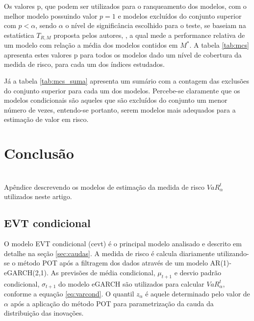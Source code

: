 \documentclass[1p]{elsarticle}
\theoremstyle{definition}
\begin{document}
Os valores p, que podem ser utilizados para o ranqueamento dos modelos, com o melhor modelo possuindo valor $p=1$ e modelos excluídos do conjunto superior com $p<\alpha$, sendo $\alpha$ o nível de significância escolhido para o teste, se baseiam na estatística $T_{R, M}$ proposta pelos autores, \cite{Hansen2011}, a qual mede a performance relativa de um modelo com relação a média dos modelos contidos em $M^\ast$. A tabela \ref{tab:mcs} apresenta estes valores p para todos os modelos dado um nível de cobertura da medida de risco, para cada um dos índices estudados.





Já a tabela \ref{tab:mcs_suma} apresenta um sumário com a contagem das exclusões do conjunto superior para cada um dos modelos. Percebe-se claramente que os modelos condicionais são aqueles que são excluídos do conjunto um menor número de vezes, entendo-se portanto, serem modelos mais adequados para a estimação de valor em risco.

\section{Conclusão}



\appendix
\section{}
\label{apendice}

Apêndice descrevendo os modelos de estimação da medida de risco $VaR^t_\alpha$ utilizados neste artigo.

\subsection{EVT condicional}

O modelo EVT condicional (cevt) é o principal modelo analisado e descrito em detalhe na seção \ref{sec:caudas}. A medida de risco é calcula diariamente utilizando-se o método POT após a filtragem dos dados através de um modelo AR(1)-eGARCH(2,1). As previsões de média condicional, $\mu_{t+1}$ e desvio padrão condicional, $\sigma_{t+1}$ do modelo eGARCH são utilizados para calcular $VaR^t_\alpha$, conforme a equação \ref{eq:varcond}. O quantil $z_\alpha$ é aquele determinado pelo valor de $\alpha$ após a aplicação do método POT para parametrização da cauda da distribuição das inovações.
\end{document}
